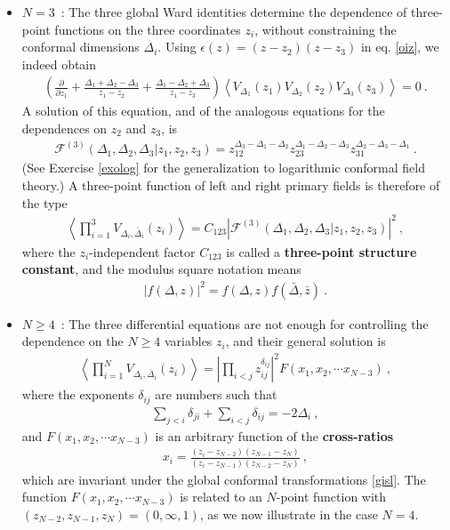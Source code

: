 \documentclass[12pt, a4paper, notitlepage, twoside]{report}
\numberwithin{equation}{section}
\theoremstyle{break}
\begin{document}
\begin{itemize}
\item $\boxed{N=3}$\ : The three global Ward identities determine the dependence of three-point functions on the three coordinates $z_i$, without constraining the conformal dimensions $\Delta_i$. Using $\epsilon(z)= (z-z_2)(z-z_3)$ in eq. \eqref{oiz}, we indeed obtain
\begin{align}
  \left(  \frac{\partial}{\partial z_1} + \frac{\Delta_1+\Delta_2-\Delta_3}{z_1-z_2} +\frac{\Delta_1-\Delta_2+\Delta_3}{z_1-z_3} \right) \left\langle V_{\Delta_1}(z_1)V_{\Delta_2}(z_2)V_{\Delta_3}(z_3)\right\rangle= 0\ .
\end{align}
A solution of this equation, and of the analogous equations for the dependences on $z_2$ and $z_3$, is 
\begin{align}
 \boxed{\mathcal{F}^{(3)}(\Delta_1,\Delta_2,\Delta_3|z_1,z_2,z_3) = z_{12}^{\Delta_3-\Delta_1-\Delta_2} z_{23}^{\Delta_1-\Delta_2-\Delta_3} z_{31}^{\Delta_2-\Delta_3-\Delta_1}}\ .
\label{fzzz}
\end{align}
(See Exercise \ref{exolog} for the generalization to logarithmic conformal field theory.)
A three-point function of left and right primary fields is therefore of the type
\begin{align}
 \boxed{ \left\langle \prod_{i=1}^3 V_{\Delta_i,\bar{\Delta}_i}(z_i) \right\rangle = C_{123}
 \left|\mathcal{F}^{(3)}(\Delta_1,\Delta_2,\Delta_3|z_1,z_2,z_3)\right|^2 }\ ,
\label{cff}
\end{align}
where the $z_i$-independent factor
$C_{123}$ is called a \textbf{\boldmath three-point structure constant}, and the modulus square notation means 
\begin{align}
|f(\Delta,z)|^2 = f(\Delta,z)f(\bar{\Delta},\bar{z})\ .
\label{eq:msn}
\end{align}

\item $\boxed{N\geq 4}$\ : The three differential equations are not enough for controlling the dependence on the $N\geq 4$ variables $z_i$, and their general solution is 
\begin{align}
 \left\langle\prod_{i=1}^N V_{\Delta_i,\bar\Delta_i}(z_i)\right\rangle = \left|\prod_{i<j} z_{ij}^{\delta_{ij}}\right|^2 F(x_1,x_2,\cdots x_{N-3}) \ ,
\label{xfxn}
\end{align}
where the exponents $\delta_{ij}$ are numbers such that 
\begin{align}
 \sum_{j< i} \delta_{ji} +\sum_{i<j}\delta_{ij} = -2\Delta_i\ ,
 \label{sdd}
\end{align}
and $F(x_1,x_2,\cdots x_{N-3})$ is an arbitrary function of the \textbf{\boldmath cross-ratios}
\begin{align}
 x_i = \frac{(z_i-z_{N-2})(z_{N-1}-z_N)}{(z_i-z_{N-1})(z_{N-2}-z_N)}\ ,
\end{align}
which are invariant under the global conformal transformations \eqref{gisl}.
The function $F(x_1,x_2,\cdots x_{N-3})$ is related to an $N$-point function with $(z_{N-2},z_{N-1},z_N)=(0,\infty,1)$, as we now illustrate in the case $N=4$.


\end{itemize}
\end{document}
